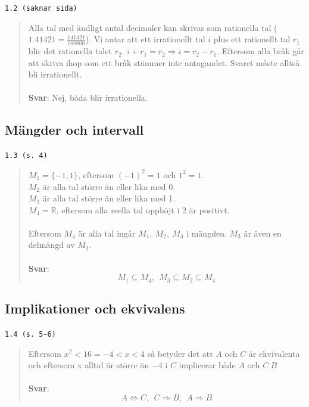 \documentclass[a4paper]{article}
\newcommand{\tskcol}[1]{\textcolor{tskcol}{#1}}
\begin{document}
	\texttt{\tskcol{1.2 (saknar sida)}}
	\begin{quotation}
		\noindent
		Alla tal med ändligt antal decimaler kan skrivas som rationella tal ($1.41421=\frac{141421}{100000}$). Vi antar att ett irrationellt tal $i$ plus ett rationellt tal $r_1$ blir det rationella talet $r_2$. $i+r_1=r_2 \Rightarrow i=r_2-r_1$. Eftersom alla bråk går att skriva ihop som ett bråk stämmer inte antagandet. Svaret måste alltså bli irrationellt.
		\\ \\
		\textbf{Svar}: Nej, båda blir irrationella.
	\end{quotation}
	
	\subsection*{Mängder och intervall}
	
	\texttt{\tskcol{1.3 (s. 4)}}
	\begin{quotation}
		\noindent
		$M_1=\{-1,1\}$, eftersom $(-1)^2=1$ och $1^2=1$.
		\\
		$M_2$ är alla tal större än eller lika med 0.
		\\
		$M_3$ är alla tal större än eller lika med 1.
		\\
		$M_4=\mathbb{R}$, eftersom alla reella tal upphöjt i 2 är positivt.
		\\ \\
		Eftersom $M_4$ är alla tal ingår $M_1,~M_2,~M_3$ i mängden. $M_3$ är även en delmängd av $M_2$.
		\\ \\
		\textbf{Svar}: \[M_1 \subseteq M_4,~~ M_3 \subseteq M_2 \subseteq M_4\]
	\end{quotation}
	
	\subsection*{Implikationer och ekvivalens}
	
	\texttt{\tskcol{1.4 (s. 5-6)}}
	\begin{quotation}
		\noindent
		Eftersom $x^2<16 = -4<x<4$ så betyder det att $A$ och $C$ är ekvivalenta och
		eftersom x alltid är större än $-4$ i $C$ implicerar både $A$ och $C~B$
		\\ \\
		\textbf{Svar}: 
		\[A \Leftrightarrow C,~~ C \Rightarrow B,~~ A \Rightarrow B\]
	\end{quotation}
	
\end{document}
